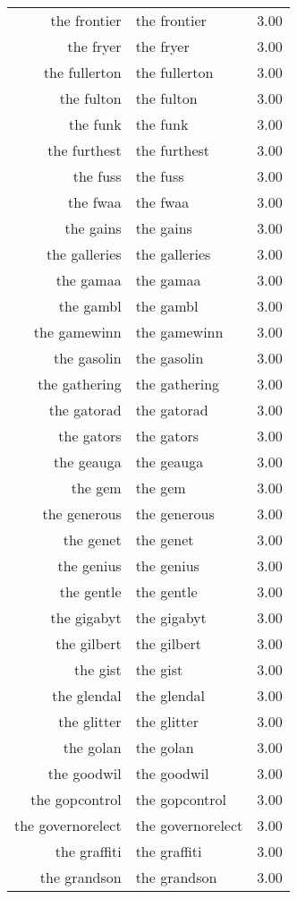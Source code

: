 \begin{table}[ht]
\begin{tabular}{rlr}
  the frontier & the frontier & 3.00 \\ 
  the fryer & the fryer & 3.00 \\ 
  the fullerton & the fullerton & 3.00 \\ 
  the fulton & the fulton & 3.00 \\ 
  the funk & the funk & 3.00 \\ 
  the furthest & the furthest & 3.00 \\ 
  the fuss & the fuss & 3.00 \\ 
  the fwaa & the fwaa & 3.00 \\ 
  the gains & the gains & 3.00 \\ 
  the galleries & the galleries & 3.00 \\ 
  the gamaa & the gamaa & 3.00 \\ 
  the gambl & the gambl & 3.00 \\ 
  the gamewinn & the gamewinn & 3.00 \\ 
  the gasolin & the gasolin & 3.00 \\ 
  the gathering & the gathering & 3.00 \\ 
  the gatorad & the gatorad & 3.00 \\ 
  the gators & the gators & 3.00 \\ 
  the geauga & the geauga & 3.00 \\ 
  the gem & the gem & 3.00 \\ 
  the generous & the generous & 3.00 \\ 
  the genet & the genet & 3.00 \\ 
  the genius & the genius & 3.00 \\ 
  the gentle & the gentle & 3.00 \\ 
  the gigabyt & the gigabyt & 3.00 \\ 
  the gilbert & the gilbert & 3.00 \\ 
  the gist & the gist & 3.00 \\ 
  the glendal & the glendal & 3.00 \\ 
  the glitter & the glitter & 3.00 \\ 
  the golan & the golan & 3.00 \\ 
  the goodwil & the goodwil & 3.00 \\ 
  the gopcontrol & the gopcontrol & 3.00 \\ 
  the governorelect & the governorelect & 3.00 \\ 
  the graffiti & the graffiti & 3.00 \\ 
  the grandson & the grandson & 3.00 \\ 

\end{tabular}
\end{table}
